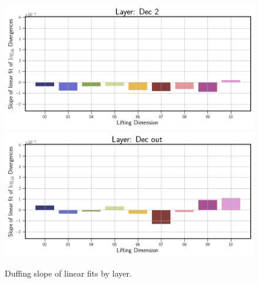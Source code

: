 \begin{figure}[!htbp]
\begin{minipage}{.5\textwidth}
        \includegraphics[width=\textwidth]{"../Figures/duffing_slope_linear_fit_dec_2.png"} 
        \includegraphics[width=\textwidth]{"../Figures/duffing_slope_linear_fit_dec_out.png"} 
    \end{minipage}
    \caption{Duffing slope of linear fits by layer.}
    \label{fig:duffing slopes all layers}
\end{figure}

